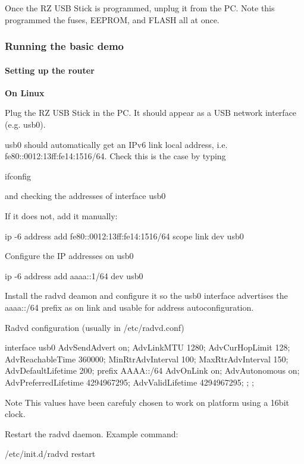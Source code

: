 \-Once the \-R\-Z \-U\-S\-B \-Stick is programmed, unplug it from the \-P\-C. \-Note this programmed the fuses, \-E\-E\-P\-R\-O\-M, and \-F\-L\-A\-S\-H all at once.



 \hypertarget{a00058_running}{}\subsubsection{\-Running the basic demo}\label{a00058_running}
\hypertarget{a00058_running_router}{}\paragraph{\-Setting up the router}\label{a00058_running_router}
{\bfseries \-On \-Linux}\par
 \-Plug the \-R\-Z \-U\-S\-B \-Stick in the \-P\-C. \-It should appear as a \-U\-S\-B network interface (e.\-g. usb0).

usb0 should automatically get an \-I\-Pv6 link local address, i.\-e. fe80\-:\-:0012\-:13ff\-:fe14\-:1516/64. \-Check this is the case by typing \begin{DoxyVerb}
ifconfig
\end{DoxyVerb}
 and checking the addresses of interface usb0

\-If it does not, add it manually\-: \begin{DoxyVerb}
ip -6 address add fe80::0012:13ff:fe14:1516/64 scope link dev usb0
\end{DoxyVerb}


\-Configure the \-I\-P addresses on usb0 \begin{DoxyVerb}
ip -6 address add aaaa::1/64 dev usb0
\end{DoxyVerb}


\-Install the radvd deamon and configure it so the usb0 interface advertises the aaaa\-:\-:/64 prefix as on link and usable for address autoconfiguration.

\-Radvd configuration (usually in /etc/radvd.conf) \begin{DoxyVerb}
interface usb0
{
    AdvSendAdvert on;
    AdvLinkMTU 1280;
    AdvCurHopLimit 128;
    AdvReachableTime 360000;
    MinRtrAdvInterval 100;
    MaxRtrAdvInterval 150;
    AdvDefaultLifetime 200;
    prefix AAAA::/64
    {
        AdvOnLink on;
        AdvAutonomous on;
        AdvPreferredLifetime 4294967295; 
        AdvValidLifetime 4294967295; 
    };
};
\end{DoxyVerb}
 \begin{DoxyNote}{\-Note}
\-This values have been carefuly chosen to work on platform using a 16bit clock.
\end{DoxyNote}
\-Restart the radvd daemon. \-Example command\-: \begin{DoxyVerb}
/etc/init.d/radvd restart
\end{DoxyVerb}



